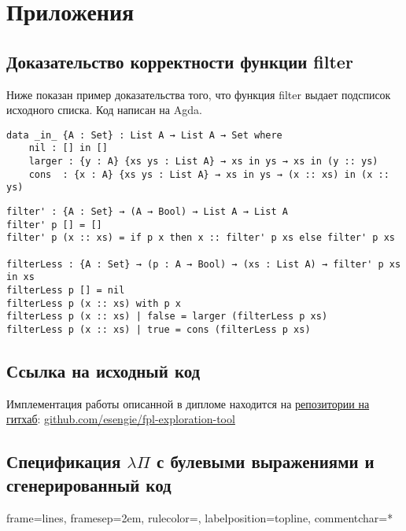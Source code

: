 \appendix
\section*{Приложения}
\renewcommand{\thesubsection}{\Alph{subsection}}

\subsection{Доказательство корректности функции filter}\label{sort_proof}

Ниже показан пример доказательства того, что функция filter выдает подсписок исходного списка.
Код написан на Agda\cite{agda}.


\begin{lstlisting}[caption={Определяем предикат означающий ``список xs является подсписком ys''},captionpos=b, frame=single]
data _in_ {A : Set} : List A → List A → Set where
    nil : [] in []
    larger : {y : A} {xs ys : List A} → xs in ys → xs in (y :: ys)
    cons  : {x : A} {xs ys : List A} → xs in ys → (x :: xs) in (x :: ys)
\end{lstlisting}



\begin{lstlisting}[caption={Докажем, что filter xs подсписок xs для любого списка xs},captionpos=b, frame=single]
filter' : {A : Set} → (A → Bool) → List A → List A
filter' p [] = []
filter' p (x :: xs) = if p x then x :: filter' p xs else filter' p xs

filterLess : {A : Set} → (p : A → Bool) → (xs : List A) → filter' p xs in xs
filterLess p [] = nil
filterLess p (x :: xs) with p x
filterLess p (x :: xs) | false = larger (filterLess p xs)
filterLess p (x :: xs) | true = cons (filterLess p xs)
\end{lstlisting}


\subsection{Ссылка на исходный код}\label{source_code}
Имплементация работы описанной в дипломе находится на \href{https://github.com/esengie/fpl-exploration-tool}{репозитории на гитхаб}: \url{github.com/esengie/fpl-exploration-tool}

\pagebreak
\subsection{Спецификация $\lambda\Pi$ с булевыми выражениями и сгенерированный код}\label{lambdaPiSpec}

{}%
{
 frame=lines,  %
 framesep=2em, %
 rulecolor=\color{Gray},
 labelposition=topline,
 commentchar=*        %
}


